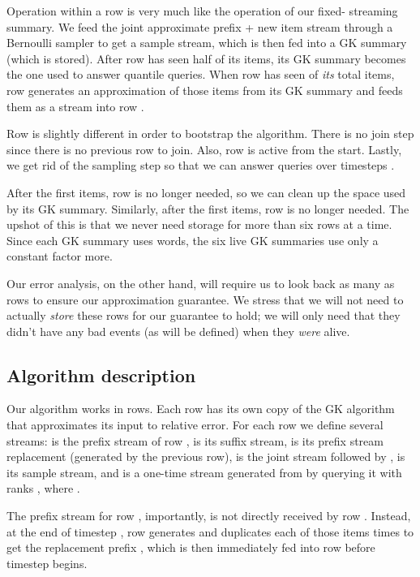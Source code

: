 \documentclass{article}
\theoremstyle{plain}
\begin{document}
Operation within a row is very much like the operation of our fixed-
streaming summary. We feed the joint approximate prefix + new item stream
through a Bernoulli sampler to get a sample stream, which is then fed into a GK
summary (which is stored). After row  has seen half of its items, its GK
summary becomes the one used to answer quantile queries. When row  has seen
 of \emph{its} total items, row  generates an approximation of those
items from its GK summary and feeds them as a stream into row .

Row  is slightly different in order to bootstrap the algorithm. There is no
join step since there is no previous row to join. Also, row  is active from
the start. Lastly, we get rid of the sampling step so that we can answer queries
over timesteps .

After the first  items, row  is no longer needed, so we can clean up
the space used by its GK summary. Similarly, after the first  items,
row  is no longer needed. The upshot of this is that we never need storage
for more than six rows at a time. Since each GK summary uses  words, the six live GK summaries use only a constant
factor more.

Our error analysis, on the other hand, will require us to look back as many as
 rows to ensure our approximation guarantee. We stress that we
will not need to actually \emph{store} these  rows for our
guarantee to hold; we will only need that they didn't have any bad events (as
will be defined) when they \emph{were} alive.



\subsection{Algorithm description}
\label{sec:online-alg}

Our algorithm works in rows. Each row  has its own copy  of the GK
algorithm that approximates its input to  relative error. For each row
 we define several streams:  is the prefix stream of row ,  is
its suffix stream,  is its prefix stream replacement (generated by the
previous row),  is the joint stream  followed by ,  is its
sample stream, and  is a one-time stream generated from  by querying
it with ranks
,
where .

The prefix stream  for row , importantly, is not
directly received by row . Instead, at the end of timestep , row
 generates  and duplicates each of those  items
 times to get the replacement prefix , which is then
immediately fed into row  before timestep  begins.
\end{document}

